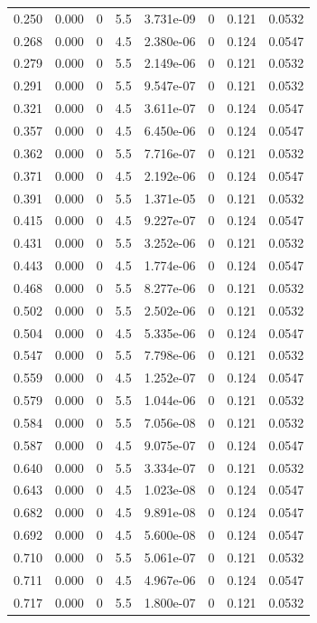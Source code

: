 \documentclass[preview]{standalone}
\begin{document}
{{\begin{tabular}{L{1.2cm}C{1.2cm} C{0.3cm}C{0.5cm} C{1.4cm}C{1.4cm} C{1.4cm}C{1.4cm}}
  0.250  &  0.000  & 0     & 5.5 &  3.731e-09  & 0  & 0.121 &  0.0532   \\ 
  0.268  &  0.000  & 0     & 4.5 &  2.380e-06  & 0  & 0.124 &  0.0547   \\ 
  0.279  &  0.000  & 0     & 5.5 &  2.149e-06  & 0  & 0.121 &  0.0532   \\ 
  0.291  &  0.000  & 0     & 5.5 &  9.547e-07  & 0  & 0.121 &  0.0532   \\ 
  0.321  &  0.000  & 0     & 4.5 &  3.611e-07  & 0  & 0.124 &  0.0547   \\ 
  0.357  &  0.000  & 0     & 4.5 &  6.450e-06  & 0  & 0.124 &  0.0547   \\ 
  0.362  &  0.000  & 0     & 5.5 &  7.716e-07  & 0  & 0.121 &  0.0532   \\ 
  0.371  &  0.000  & 0     & 4.5 &  2.192e-06  & 0  & 0.124 &  0.0547   \\ 
  0.391  &  0.000  & 0     & 5.5 &  1.371e-05  & 0  & 0.121 &  0.0532   \\ 
  0.415  &  0.000  & 0     & 4.5 &  9.227e-07  & 0  & 0.124 &  0.0547   \\ 
  0.431  &  0.000  & 0     & 5.5 &  3.252e-06  & 0  & 0.121 &  0.0532   \\ 
  0.443  &  0.000  & 0     & 4.5 &  1.774e-06  & 0  & 0.124 &  0.0547   \\ 
  0.468  &  0.000  & 0     & 5.5 &  8.277e-06  & 0  & 0.121 &  0.0532   \\ 
  0.502  &  0.000  & 0     & 5.5 &  2.502e-06  & 0  & 0.121 &  0.0532   \\ 
  0.504  &  0.000  & 0     & 4.5 &  5.335e-06  & 0  & 0.124 &  0.0547   \\ 
  0.547  &  0.000  & 0     & 5.5 &  7.798e-06  & 0  & 0.121 &  0.0532   \\ 
  0.559  &  0.000  & 0     & 4.5 &  1.252e-07  & 0  & 0.124 &  0.0547   \\ 
  0.579  &  0.000  & 0     & 5.5 &  1.044e-06  & 0  & 0.121 &  0.0532   \\ 
  0.584  &  0.000  & 0     & 5.5 &  7.056e-08  & 0  & 0.121 &  0.0532   \\ 
  0.587  &  0.000  & 0     & 4.5 &  9.075e-07  & 0  & 0.124 &  0.0547   \\ 
  0.640  &  0.000  & 0     & 5.5 &  3.334e-07  & 0  & 0.121 &  0.0532   \\ 
  0.643  &  0.000  & 0     & 4.5 &  1.023e-08  & 0  & 0.124 &  0.0547   \\ 
  0.682  &  0.000  & 0     & 4.5 &  9.891e-08  & 0  & 0.124 &  0.0547   \\ 
  0.692  &  0.000  & 0     & 4.5 &  5.600e-08  & 0  & 0.124 &  0.0547   \\ 
  0.710  &  0.000  & 0     & 5.5 &  5.061e-07  & 0  & 0.121 &  0.0532   \\ 
  0.711  &  0.000  & 0     & 4.5 &  4.967e-06  & 0  & 0.124 &  0.0547   \\ 
  0.717  &  0.000  & 0     & 5.5 &  1.800e-07  & 0  & 0.121 &  0.0532   \\ 
\hline 
\end{tabular} 

}}
\end{document}
